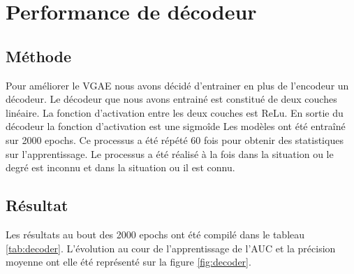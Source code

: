 \documentclass{article}
\begin{document}
\begin{table}[H]
    \captionsetup{justification=centering}
    \caption{Résultats de l'utilisation du dropout. \\ \footnotesize Dans chaque case est indiqué la moyenne et l'écart-type au format : moyenne(écart-type)}
    \label{tab:dropout}
\end{table}


\section{Performance de décodeur}
\subsection{Méthode}
Pour améliorer le VGAE nous avons décidé d'entrainer en plus de l'encodeur un décodeur. 
Le décodeur que nous avons entrainé est constitué de deux couches linéaire.
La fonction d'activation entre les deux couches est ReLu.
En sortie du décodeur la fonction d'activation est une sigmoîde
Les modèles ont été entraîné sur 2000 epochs. 
Ce processus a été répété 60 fois pour obtenir des statistiques sur l'apprentissage.
Le processus a été réalisé à la fois dans la situation ou le degré est inconnu et dans la situation ou il est connu.

\subsection{Résultat}
Les résultats au bout des 2000 epochs ont été compilé dans le tableau \ref{tab:decoder}.
L'évolution au cour de l'apprentissage de l'AUC et la précision moyenne ont elle été représenté sur la figure \ref{fig:decoder}.
\end{document}

